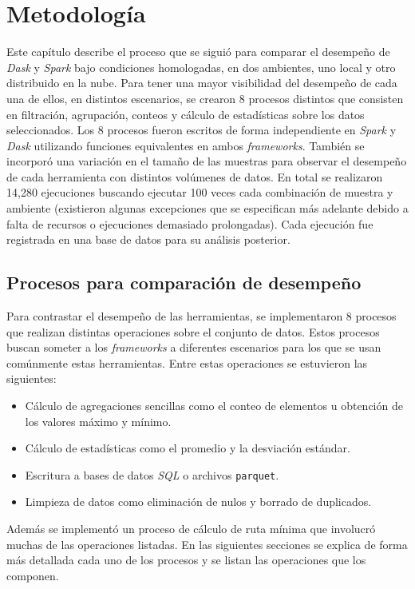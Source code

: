 \chapter{Metodología}

\noindent Este capítulo describe el proceso que se siguió para comparar el desempeño de \textit{Dask} y \textit{Spark} bajo condiciones homologadas, en dos ambientes, uno local y otro distribuido en la nube. Para tener una mayor visibilidad del desempeño de cada una de ellos, en distintos escenarios, se crearon 8 procesos distintos que consisten en filtración, agrupación, conteos y cálculo de estadísticas sobre los datos seleccionados. Los 8 procesos fueron escritos de forma independiente en \textit{Spark} y \textit{Dask} utilizando funciones equivalentes en ambos \textit{frameworks}. También se incorporó una variación en el tamaño de las muestras para observar el desempeño de cada herramienta con distintos volúmenes de datos. En total se realizaron 14,280 ejecuciones buscando ejecutar 100 veces cada combinación de muestra y ambiente (existieron algunas excepciones que se especifican más adelante debido a falta de recursos o ejecuciones demasiado prolongadas). Cada ejecución fue registrada en una base de datos para su análisis posterior.
\newpage

\section{Procesos para comparación de desempeño}

Para contrastar el desempeño de las herramientas, se implementaron 8 procesos que realizan distintas operaciones sobre el conjunto de datos. Estos procesos buscan someter a los \textit{frameworks} a diferentes escenarios para los que se usan comúnmente estas herramientas. Entre estas operaciones se estuvieron las siguientes:
\begin{itemize}
	\item Cálculo de agregaciones sencillas como el conteo de elementos u obtención de los valores máximo y mínimo.
	\item Cálculo de estadísticas como el promedio y la desviación estándar.
	\item Escritura a bases de datos \textit{SQL} o archivos \texttt{parquet}.
	\item Limpieza de datos como eliminación de nulos y borrado de duplicados.
\end{itemize}

Además se implementó un proceso de cálculo de ruta mínima que involucró muchas de las operaciones listadas. En las siguientes secciones se explica de forma más detallada cada uno de los procesos y se listan las operaciones que los componen.

